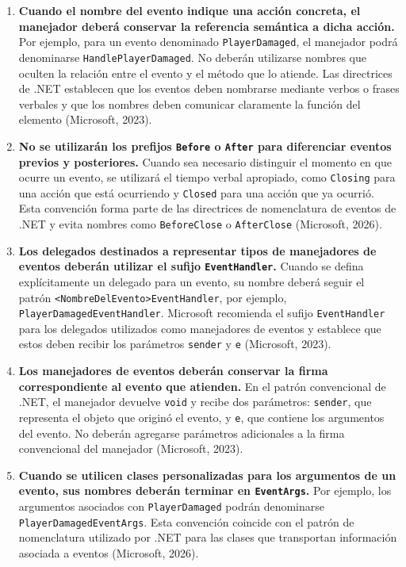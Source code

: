 \begin{enumerate}
\item \textbf{Cuando el nombre del evento indique una acción concreta, el manejador deberá conservar la referencia semántica a dicha acción.} Por ejemplo, para un evento denominado \texttt{PlayerDamaged}, el manejador podrá denominarse \texttt{HandlePlayerDamaged}. No deberán utilizarse nombres que oculten la relación entre el evento y el método que lo atiende. Las directrices de .NET establecen que los eventos deben nombrarse mediante verbos o frases verbales y que los nombres deben comunicar claramente la función del elemento (Microsoft, 2023).

\item \textbf{No se utilizarán los prefijos \texttt{Before} o \texttt{After} para diferenciar eventos previos y posteriores.} Cuando sea necesario distinguir el momento en que ocurre un evento, se utilizará el tiempo verbal apropiado, como \texttt{Closing} para una acción que está ocurriendo y \texttt{Closed} para una acción que ya ocurrió. Esta convención forma parte de las directrices de nomenclatura de eventos de .NET y evita nombres como \texttt{BeforeClose} o \texttt{AfterClose} (Microsoft, 2026).

\item \textbf{Los delegados destinados a representar tipos de manejadores de eventos deberán utilizar el sufijo \texttt{EventHandler}.} Cuando se defina explícitamente un delegado para un evento, su nombre deberá seguir el patrón \texttt{<NombreDelEvento>EventHandler}, por ejemplo, \texttt{PlayerDamagedEventHandler}. Microsoft recomienda el sufijo \texttt{EventHandler} para los delegados utilizados como manejadores de eventos y establece que estos deben recibir los parámetros \texttt{sender} y \texttt{e} (Microsoft, 2023).

\item \textbf{Los manejadores de eventos deberán conservar la firma correspondiente al evento que atienden.} En el patrón convencional de .NET, el manejador devuelve \texttt{void} y recibe dos parámetros: \texttt{sender}, que representa el objeto que originó el evento, y \texttt{e}, que contiene los argumentos del evento. No deberán agregarse parámetros adicionales a la firma convencional del manejador (Microsoft, 2023).

\item \textbf{Cuando se utilicen clases personalizadas para los argumentos de un evento, sus nombres deberán terminar en \texttt{EventArgs}.} Por ejemplo, los argumentos asociados con \texttt{PlayerDamaged} podrán denominarse \texttt{PlayerDamagedEventArgs}. Esta convención coincide con el patrón de nomenclatura utilizado por .NET para las clases que transportan información asociada a eventos (Microsoft, 2026).

\end{enumerate}


